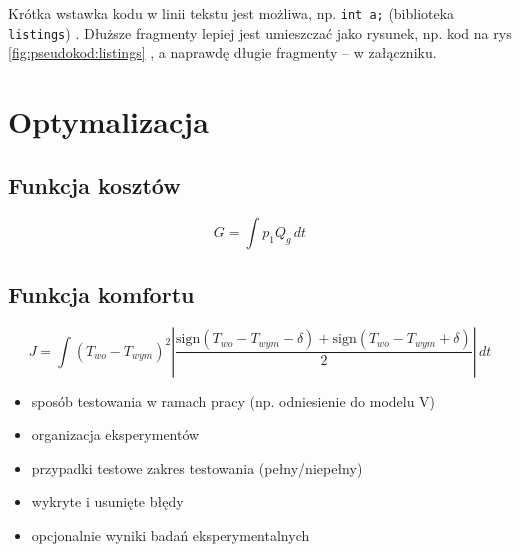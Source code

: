 \documentclass[a4paper,twoside,12pt]{book}
\begin{document}


Krótka wstawka kodu w linii tekstu jest możliwa, np.  \lstinline|int a;| (biblioteka \texttt{listings})%
.
Dłuższe fragmenty lepiej jest umieszczać jako rysunek, np. kod na rys \ref{fig:pseudokod:listings}%
, a naprawdę długie fragmenty – w załączniku.

%      


\chapter{Optymalizacja}
\label{ch:06}
\section{Funkcja kosztów}
\begin{equation}
	G = \int p_1 Q_g \, dt
\end{equation}
\section{Funkcja komfortu}
\begin{equation}
	J = \int \left( T_{wo} - T_{wym} \right)^2 \left| \frac{\text{sign}(T_{wo} - T_{wym} - \delta) + \text{sign}(T_{wo} - T_{wym} + \delta)}{2} \right| \, dt
\end{equation}


\begin{itemize}
	\item sposób testowania w ramach pracy (np. odniesienie do modelu V)
	\item organizacja eksperymentów
	\item przypadki testowe zakres testowania (pełny/niepełny)
	\item wykryte i usunięte błędy
	\item opcjonalnie wyniki badań eksperymentalnych
\end{itemize}
\end{document}
